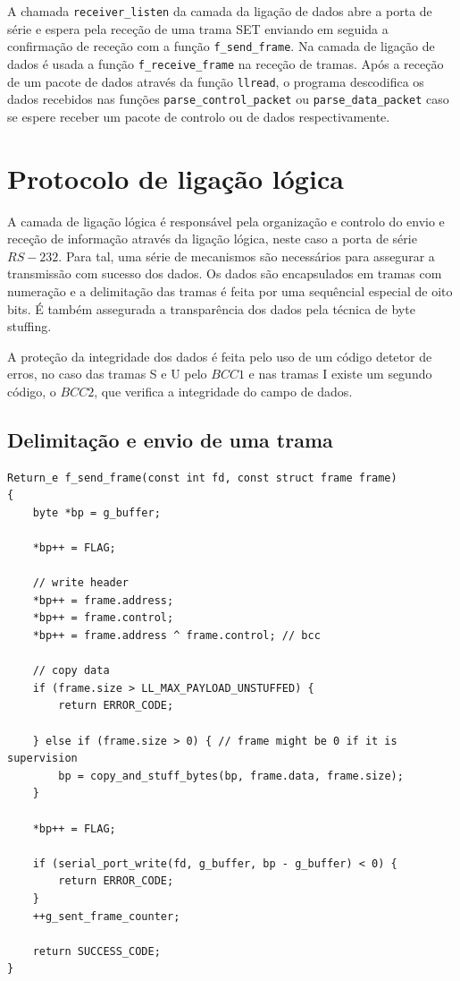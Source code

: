 \documentclass[a4paper,11pt,titlepage]{article}
\begin{document}
A chamada \texttt{receiver\_listen} da camada da ligação de dados abre a porta de série e espera pela receção de uma trama SET enviando em seguida a confirmação de receção com a função \texttt{f\_send\_frame}. Na camada de ligação de dados é usada a função \texttt{f\_receive\_frame} na receção de tramas. Após a receção de um pacote de dados através da função \texttt{llread}, o programa descodifica os dados recebidos nas funções \texttt{parse\_control\_packet} ou \texttt{parse\_data\_packet} caso se espere receber um pacote de controlo ou de dados respectivamente.

\section{Protocolo de ligação lógica}

A camada de ligação lógica é responsável pela organização e controlo do envio e receção de informação através da ligação lógica, neste caso a porta de série $RS-232$. Para tal, uma série de mecanismos são necessários para assegurar a transmissão com sucesso dos dados. Os dados são encapsulados em tramas com numeração e a delimitação das tramas é feita por uma sequêncial especial de oito bits.
É também assegurada a transparência dos dados pela técnica de byte stuffing.

A proteção da integridade dos dados é feita  pelo uso de um código detetor de erros, no caso das tramas S e U pelo $BCC1$ e nas tramas I existe um segundo código, o $BCC2$, que verifica a integridade do campo de dados.

\subsection*{Delimitação e envio de uma trama}
\begin{lstlisting}[style=customc]
Return_e f_send_frame(const int fd, const struct frame frame)
{
	byte *bp = g_buffer;

	*bp++ = FLAG;

	// write header
	*bp++ = frame.address;
	*bp++ = frame.control;
	*bp++ = frame.address ^ frame.control; // bcc

	// copy data
	if (frame.size > LL_MAX_PAYLOAD_UNSTUFFED) {
		return ERROR_CODE;

	} else if (frame.size > 0) { // frame might be 0 if it is supervision
		bp = copy_and_stuff_bytes(bp, frame.data, frame.size);
	}

	*bp++ = FLAG;

	if (serial_port_write(fd, g_buffer, bp - g_buffer) < 0) {
		return ERROR_CODE;
	}
	++g_sent_frame_counter;

	return SUCCESS_CODE;
}
\end{lstlisting}
\end{document}
